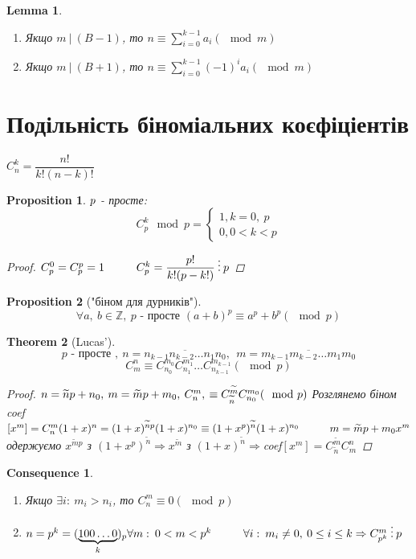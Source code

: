 \documentclass[a4paper,12pt, centered]{bookest}
\newtheorem{theorem}{Theorem}[section]
\newtheorem{lemma}[theorem]{Lemma}
\newtheorem*{prop*}{Proposition}
\newtheorem*{cons*}{Consequence}
\newcommand\tab[1][1cm]{\hspace*{#1}}
\begin{document}
\begin{lemma}$ $
	\begin{enumerate}
		\item Якщо $m\>|\>(B-1)$, то $n\equiv\sum\limits_{i=0}^{k-1}a_i(\mod m)$
		\item Якщо $m\>|\>(B+1)$, то $n\equiv\sum\limits_{i=0}^{k-1}(-1)^ia_i(\mod m)$
	\end{enumerate}
\end{lemma}
\section{Подільність біноміальних коєфіціентів}
$C_n^k=\dfrac{n!}{k!(n-k)!}$
\begin{prop*}
	$\\p$ - просте: $$C_p^k\mod p=\begin{cases}
		1, k=0,\>p\\0, 0<k<p
	\end{cases}$$
	\begin{proof}
		$\\C_p^0=C_p^p=1\tab C^k_p=\dfrac{p!}{k!(p-k!)}\>\vdots\>p$
	\end{proof}
\end{prop*}
\begin{prop*}["біном для дурників"]
	$$\forall a,\>b\in\mathbb{Z},\> p\textrm{ - просте }(a+b)^p\equiv a^p+b^p(\mod p)$$
\end{prop*}
\begin{theorem}[Lucas']
	$$ p\textrm{ - просте },\>n=\overline{n_{k-1}n_{k-2}\dots n_1n_0},\>\>m=\overline{m_{k-1}m_{k-2}\dots m_1m_0}$$
	$$C_m^n\equiv C^{m_0}_{n_0}C^{m_1}_{n_1}\dots C^{m_{k-1}}_{n_{k-1}}(\mod p)$$
	\begin{proof}
		$\\n=\widetilde{n}p+n_0,\>m=\widetilde{m}p+m_0,\>C^{m}_{n},\>\equiv C^{\widetilde{m}}_{\widetilde{n}}C^{m_0}_{n_0}(\mod p)\\$ Розглянемо біном \tab coef$[x^m]=C^m_n\\(1+x)^n=(1+x)^{\widetilde{n}p}(1+x)^{n_0}\equiv (1+x^p)^{\widetilde{n}}(1+x)^{n_0}\tab m=\widetilde{m}p+m_0\\x^m$ одержуємо $x^{\widetilde{m}p}$ з $(1+x^p)^{\widetilde{n}}\Rightarrow x^{\widetilde{m}}$ з $(1+x)^{\widetilde{n}}\Rightarrow$coef$[x^m]=C^{\widetilde{m}}_{\widetilde{n}}C_m^n$ 
	\end{proof}
\end{theorem}\newpage
\begin{cons*}$ $
	\begin{enumerate}
		\item Якщо $\exists i:\>m_i>n_i$, то $C_n^m\equiv 0(\mod p)$
		\item $n=p^k=(\underbrace{100\dots0}_{k})_p\\\forall m:\>0<m<p^k\tab \forall i:\>m_i\ne 0,\>0\leq i\leq k\Rightarrow C_{p^k}^{m}\>\vdots\>p$
	\end{enumerate}
\end{cons*}
\end{document}

